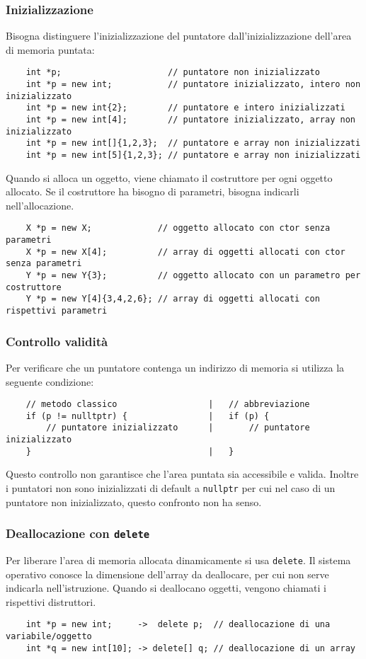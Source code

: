 \documentclass[a4paper]{article}
\begin{document}
\subsubsection*{Inizializzazione}
Bisogna distinguere l'inizializzazione del puntatore dall'inizializzazione dell'area di memoria puntata:
\begin{lstlisting}
	int *p;                     // puntatore non inizializzato
	int *p = new int;           // puntatore inizializzato, intero non inizializzato
	int *p = new int{2};        // puntatore e intero inizializzati
	int *p = new int[4];        // puntatore inizializzato, array non inizializzato
	int *p = new int[]{1,2,3};  // puntatore e array non inizializzati
	int *p = new int[5]{1,2,3}; // puntatore e array non inizializzati
\end{lstlisting}
Quando si alloca un oggetto, viene chiamato il costruttore per ogni oggetto allocato. Se il costruttore ha bisogno di parametri,
bisogna indicarli nell'allocazione.
\begin{lstlisting}
	X *p = new X;             // oggetto allocato con ctor senza parametri
	X *p = new X[4];          // array di oggetti allocati con ctor senza parametri
	Y *p = new Y{3};          // oggetto allocato con un parametro per costruttore
	Y *p = new Y[4]{3,4,2,6}; // array di oggetti allocati con rispettivi parametri
\end{lstlisting}

\subsubsection*{Controllo validità}
Per verificare che un puntatore contenga un indirizzo di memoria si utilizza la seguente condizione:
\begin{lstlisting}
	// metodo classico                  |   // abbreviazione
	if (p != nulltptr) {				|	if (p) {
		// puntatore inizializzato		|		// puntatore inizializzato
	}									|	}
\end{lstlisting}
Questo controllo non garantisce che l'area puntata sia accessibile e valida. Inoltre i puntatori non sono inizializzati di
default a \verb|nullptr| per cui nel caso di un puntatore non inizializzato, questo confronto non ha senso.

\subsubsection*{Deallocazione con \texttt{delete}}
Per liberare l'area di memoria allocata dinamicamente si usa \verb|delete|. Il sistema operativo conosce la dimensione dell'array
da deallocare, per cui non serve indicarla nell'istruzione. Quando si deallocano oggetti, vengono chiamati i rispettivi distruttori.
\begin{lstlisting}
	int *p = new int;     ->  delete p;  // deallocazione di una variabile/oggetto
	int *q = new int[10]; -> delete[] q; // deallocazione di un array
\end{lstlisting}
\end{document}
